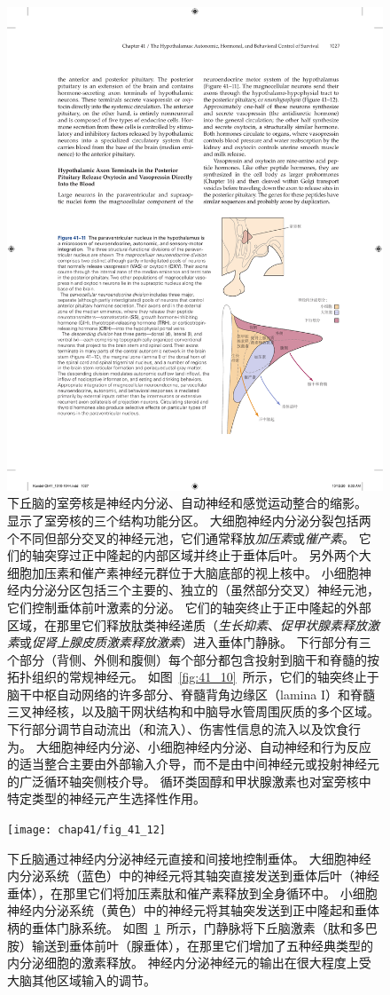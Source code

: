 \begin{figure}[htbp]
	\centering
	\includegraphics[width=0.54\linewidth]{chap41/fig_41_11}
	\caption{下丘脑的室旁核是神经内分泌、自动神经和感觉运动整合的缩影。
		显示了室旁核的三个结构功能分区。
		大细胞神经内分泌分裂包括两个不同但部分交叉的神经元池，它们通常释放\textit{加压素}或\textit{催产素}。
		它们的轴突穿过正中隆起的内部区域并终止于垂体后叶。
		另外两个大细胞加压素和催产素神经元群位于大脑底部的视上核中。
		小细胞神经内分泌分区包括三个主要的、独立的（虽然部分交叉）神经元池，它们控制垂体前叶激素的分泌。
		它们的轴突终止于正中隆起的外部区域，在那里它们释放肽类神经递质（\textit{生长抑素}、\textit{促甲状腺素释放激素}或\textit{促肾上腺皮质激素释放激素}）进入垂体门静脉。
		下行部分有三个部分（背侧、外侧和腹侧）每个部分都包含投射到脑干和脊髓的按拓扑组织的常规神经元。
		如图~\ref{fig:41_10}~所示，它们的轴突终止于脑干中枢自动网络的许多部分、脊髓背角边缘区（lamina I）和脊髓三叉神经核，以及脑干网状结构和中脑导水管周围灰质的多个区域。
		下行部分调节自动流出（和流入）、伤害性信息的流入以及饮食行为。
		大细胞神经内分泌、小细胞神经内分泌、自动神经和行为反应的适当整合主要由外部输入介导，而不是由中间神经元或投射神经元的广泛循环轴突侧枝介导。
		循环类固醇和甲状腺激素也对室旁核中特定类型的神经元产生选择性作用。}
	\label{fig:41_11}
\end{figure}


\begin{figure}[htbp]
	\centering
	\texttt{[image: chap41/fig\_41\_12]}
	\caption{下丘脑通过神经内分泌神经元直接和间接地控制垂体。
		大细胞神经内分泌系统（蓝色）中的神经元将其轴突直接发送到垂体后叶（神经垂体），在那里它们将加压素肽和催产素释放到全身循环中。
		小细胞神经内分泌系统（黄色）中的神经元将其轴突发送到正中隆起和垂体柄的垂体门脉系统。
		如图~\ref{fig:41_11}~所示，门静脉将下丘脑激素（肽和多巴胺）输送到垂体前叶（腺垂体），在那里它们增加了五种经典类型的内分泌细胞的激素释放。
		神经内分泌神经元的输出在很大程度上受大脑其他区域输入的调节。}
	\label{fig:41_12}
\end{figure}


